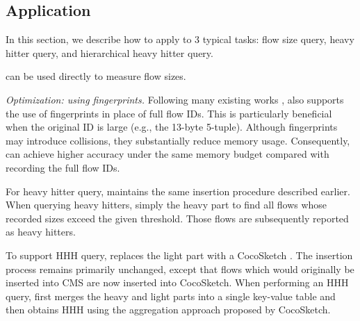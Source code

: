 \subsection{Application}


In this section, we describe how to apply \alg{} to 3 typical tasks: flow size query, heavy hitter query, and hierarchical heavy hitter query.


%
\alg{} can be used directly to measure flow sizes.


\textit{Optimization: using fingerprints.}
%
Following many existing works \cite{dhs, mimosketch}, \alg{} also supports the use of fingerprints in place of full flow IDs. This is particularly beneficial when the original ID is large (e.g., the 13-byte 5-tuple).
%
Although fingerprints may introduce collisions, they substantially reduce memory usage. Consequently, \alg{} can achieve higher accuracy under the same memory budget compared with recording the full flow IDs.




%
For heavy hitter query, \alg{} maintains the same insertion procedure described earlier.
%
When querying heavy hitters, \alg{} simply the heavy part to find all flows whose recorded sizes exceed the given threshold. Those flows are subsequently reported as heavy hitters.




%
To support HHH query, \alg{} replaces the light part with a CocoSketch \cite{cocosketch}. The insertion process remains primarily unchanged, except that flows which would originally be inserted into CMS are now inserted into CocoSketch. When performing an HHH query, \alg{} first merges the heavy and light parts into a single key-value table and then obtains HHH using the aggregation approach proposed by CocoSketch.





